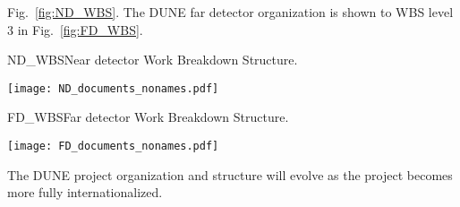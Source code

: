 Fig.~\ref{fig:ND_WBS}.
The DUNE far detector organization is shown to WBS level 3 in 
Fig.~\ref{fig:FD_WBS}.
\begin{cdrfigure}{ND_WBS}{Near detector Work Breakdown Structure.}
\centering
\begin{center}
\texttt{[image: ND\_documents\_nonames.pdf]}
\end{center}
\end{cdrfigure}
\begin{cdrfigure}{FD_WBS}{Far detector Work Breakdown Structure.}
\centering
\begin{center}
\texttt{[image: FD\_documents\_nonames.pdf]}
\end{center}
\end{cdrfigure}
The DUNE project organization and structure will evolve as the project
becomes more fully internationalized.
